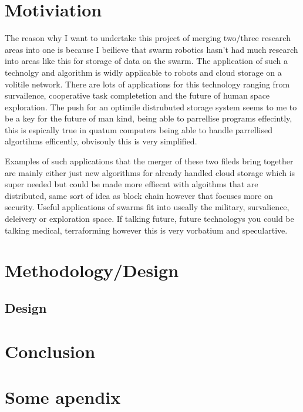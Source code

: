 \documentclass{UoYCSproject}
\begin{document}
\chapter{Motiviation}
\label{cha:Motivation}

The reason why I want to undertake this project of merging two/three research areas into one is because I beilieve that swarm robotics hasn't had much research into areas like this for storage of data on the swarm.
The application of such a technolgy and algorithm is widly applicable to robots and cloud storage on a volitile network.
There are lots of applications for this technology ranging from survailence, cooperative task completetion and the future of human space exploration.
The push for an optimile distrubuted storage system seems to me to be a key for the future of man kind, being able to parrellise programs effecintly, this is espically true in quatum computers being able to handle parrellised algortihms efficently, obvisouly this is very simplified.

Examples of such applications that the merger of these two fileds bring together are mainly either just new algorithms for already handled cloud storage which is super needed but could be made more effiecnt with algoithms that are distributed, same sort of idea as block chain however that focuses more on security.
Useful applications of swarms fit into useally the military, survalience, deleivery or exploration space.
If talking future, future technologys you could be talking medical, terraforming however this is very vorbatium and speculartive.


\chapter{Methodology/Design}
\label{cha:Methodology/Design}

\section{Design}
\label{sec:Design}



\chapter{Conclusion}
\label{cha:conclusion}


\appendix
\chapter{Some apendix}
\end{document}
